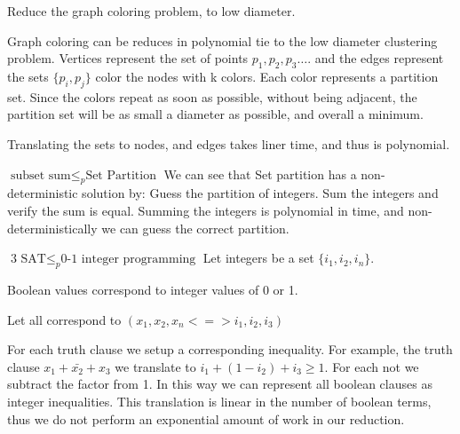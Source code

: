 \documentclass[12pt]{article}
\newenvironment{problem}[2][Problem]{\begin{trivlist}
\item[\hskip \labelsep {\bfseries #1}\hskip \labelsep {\bfseries #2.}]}{\end{trivlist}}
\begin{document}
\begin{problem}{8.20}
    Reduce the graph coloring problem, to low diameter.

    Graph coloring can be reduces in polynomial tie to the low diameter
    clustering problem. Vertices represent the set of points $p_1, p_2,
    p_3\dots$.  and the edges represent the sets $\{p_i, p_j\}$ color the nodes
    with k colors. Each color represents a partition set. Since the colors
    repeat as soon as possible, without being adjacent, the partition set will
    be as small a diameter as possible, and overall a minimum.

    Translating the sets to nodes, and edges takes liner time, and thus is
    polynomial.
\end{problem}

\begin{problem}{Set Partitioning}
    $\text{subset sum} \le_p \text{Set Partition}$
We can see that Set partition has a non-deterministic solution by: Guess the
partition of integers. Sum the integers and verify the sum is equal. Summing the
integers is polynomial in time, and non-deterministically we can guess the
correct partition.


\end{problem}

\begin{problem}{0-1 integer programming}
$\text{3 SAT} \le_p \text{0-1 integer programming}$
Let integers be a set $\{i_1, i_2, i_n\}$.

Boolean values correspond to integer values of 0 or 1.

Let all correspond to  $(x_1, x_2, x_n <=> i_1, i_2, i_3)$

For each truth clause we setup a corresponding inequality. For example, the
truth clause $x_1 + \bar{x_2} + x_3$ we translate to $i_1 + (1 - i_2) + i_3 \ge
1$.
For each not we subtract the factor from 1. In this way we can represent all
boolean clauses as integer inequalities. This translation is linear in the
number of boolean terms, thus we do not perform an exponential amount of work
in our reduction. 

\end{problem}
\end{document}

